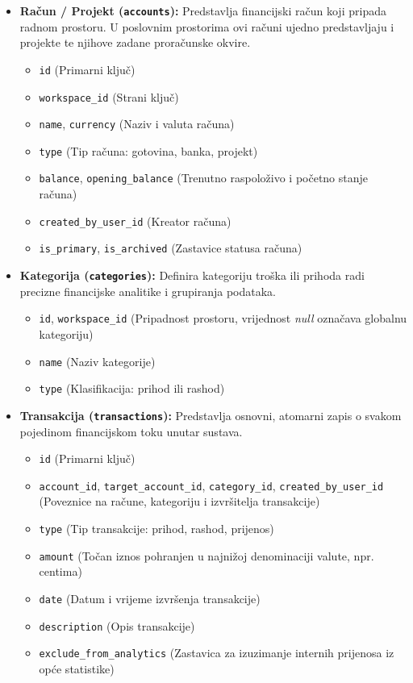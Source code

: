 \documentclass[a4paper,12pt,oneside]{article}
\begin{document}
\begin{itemize}
		\item \textbf{Račun / Projekt (\texttt{accounts}):} Predstavlja financijski račun koji pripada radnom prostoru. U poslovnim prostorima ovi računi ujedno predstavljaju i projekte te njihove zadane proračunske okvire.
		\begin{itemize}
			\item \texttt{id} (Primarni ključ)
			\item \texttt{workspace\_id} (Strani ključ)
			\item \texttt{name}, \texttt{currency} (Naziv i valuta računa)
			\item \texttt{type} (Tip računa: gotovina, banka, projekt)
			\item \texttt{balance}, \texttt{opening\_balance} (Trenutno raspoloživo i početno stanje računa)
			\item \texttt{created\_by\_user\_id} (Kreator računa)
			\item \texttt{is\_primary}, \texttt{is\_archived} (Zastavice statusa računa)
		\end{itemize}
		
	\newpage
		
		\item \textbf{Kategorija (\texttt{categories}):} Definira kategoriju troška ili prihoda radi precizne financijske analitike i grupiranja podataka.
		\begin{itemize}
			\item \texttt{id}, \texttt{workspace\_id} (Pripadnost prostoru, vrijednost \textit{null} označava globalnu kategoriju)
			\item \texttt{name} (Naziv kategorije)
			\item \texttt{type} (Klasifikacija: prihod ili rashod)

		\end{itemize}
		
		\item \textbf{Transakcija (\texttt{transactions}):} Predstavlja osnovni, atomarni zapis o svakom pojedinom financijskom toku unutar sustava.
		\begin{itemize}
			\item \texttt{id} (Primarni ključ)
			\item \texttt{account\_id}, \texttt{target\_account\_id}, \texttt{category\_id}, \texttt{created\_by\_user\_id} (Poveznice na račune, kategoriju i izvršitelja transakcije)
			\item \texttt{type} (Tip transakcije: prihod, rashod, prijenos)
			\item \texttt{amount} (Točan iznos pohranjen u najnižoj denominaciji valute, npr. centima)
			\item \texttt{date} (Datum i vrijeme izvršenja transakcije)
			\item \texttt{description} (Opis transakcije)
			\item \texttt{exclude\_from\_analytics} (Zastavica za izuzimanje internih prijenosa iz opće statistike)
		\end{itemize}
		
	\end{itemize}
\end{document}
